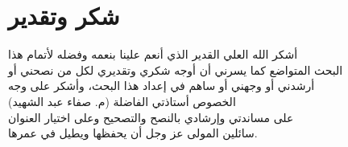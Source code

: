\chapter*{شكر وتقدير}
\begin{center}
	\amirifont
	أشكر الله العلي القدير الذي أنعم علينا بنعمه وفضله لأتمام هذا \\[10pt]
	البحث المتواضع كما يسرني أن أوجه شكري وتقديري لكل من نصحني أو \\[10pt]
	أرشدني أو وجهني أو ساهم في إعداد هذا البحث، وأشكر على وجه \\[10pt]
	الخصوص أستاذتي الفاضلة (م. صفاء عبد الشهيد) \\[10pt]
	على مساندتي وإرشادي بالنصح والتصحيح وعلى اختيار العنوان \\[10pt]
	سائلين المولى عز وجل أن يحفظها ويطيل في عمرها.
\end{center}